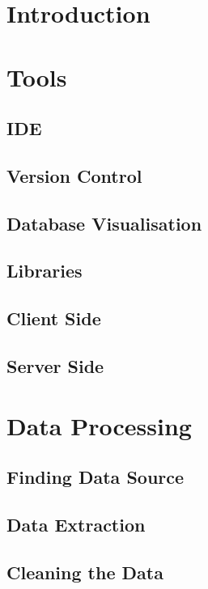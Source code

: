\section{Introduction}
\section{Tools}
\subsection{IDE}
\subsection{Version Control}
\subsection{Database Visualisation}
\subsection{Libraries}
\subsection{Client Side}
\subsection{Server Side}
\section{Data Processing}
\subsection{Finding Data Source}
\subsection{Data Extraction}
\subsection{Cleaning the Data}
